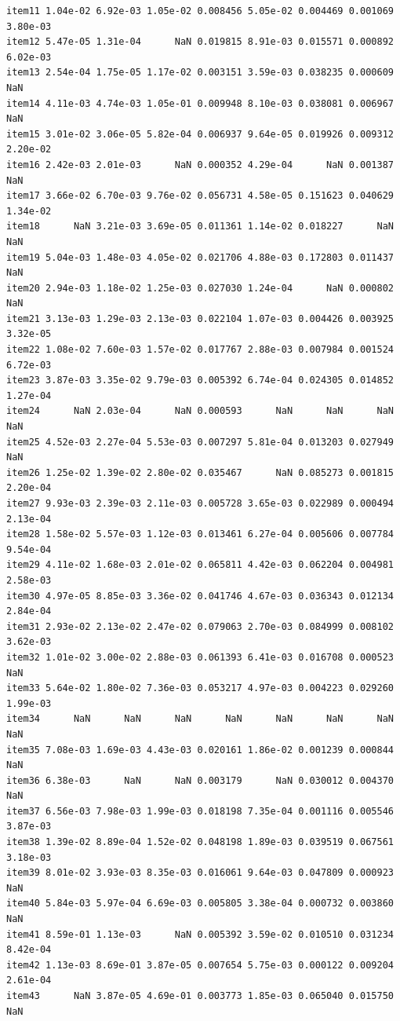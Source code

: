 \documentclass[
  a4paper,
]{ltjsbook}
\begin{document}
\begin{verbatim}
item11 1.04e-02 6.92e-03 1.05e-02 0.008456 5.05e-02 0.004469 0.001069 3.80e-03
item12 5.47e-05 1.31e-04      NaN 0.019815 8.91e-03 0.015571 0.000892 6.02e-03
item13 2.54e-04 1.75e-05 1.17e-02 0.003151 3.59e-03 0.038235 0.000609      NaN
item14 4.11e-03 4.74e-03 1.05e-01 0.009948 8.10e-03 0.038081 0.006967      NaN
item15 3.01e-02 3.06e-05 5.82e-04 0.006937 9.64e-05 0.019926 0.009312 2.20e-02
item16 2.42e-03 2.01e-03      NaN 0.000352 4.29e-04      NaN 0.001387      NaN
item17 3.66e-02 6.70e-03 9.76e-02 0.056731 4.58e-05 0.151623 0.040629 1.34e-02
item18      NaN 3.21e-03 3.69e-05 0.011361 1.14e-02 0.018227      NaN      NaN
item19 5.04e-03 1.48e-03 4.05e-02 0.021706 4.88e-03 0.172803 0.011437      NaN
item20 2.94e-03 1.18e-02 1.25e-03 0.027030 1.24e-04      NaN 0.000802      NaN
item21 3.13e-03 1.29e-03 2.13e-03 0.022104 1.07e-03 0.004426 0.003925 3.32e-05
item22 1.08e-02 7.60e-03 1.57e-02 0.017767 2.88e-03 0.007984 0.001524 6.72e-03
item23 3.87e-03 3.35e-02 9.79e-03 0.005392 6.74e-04 0.024305 0.014852 1.27e-04
item24      NaN 2.03e-04      NaN 0.000593      NaN      NaN      NaN      NaN
item25 4.52e-03 2.27e-04 5.53e-03 0.007297 5.81e-04 0.013203 0.027949      NaN
item26 1.25e-02 1.39e-02 2.80e-02 0.035467      NaN 0.085273 0.001815 2.20e-04
item27 9.93e-03 2.39e-03 2.11e-03 0.005728 3.65e-03 0.022989 0.000494 2.13e-04
item28 1.58e-02 5.57e-03 1.12e-03 0.013461 6.27e-04 0.005606 0.007784 9.54e-04
item29 4.11e-02 1.68e-03 2.01e-02 0.065811 4.42e-03 0.062204 0.004981 2.58e-03
item30 4.97e-05 8.85e-03 3.36e-02 0.041746 4.67e-03 0.036343 0.012134 2.84e-04
item31 2.93e-02 2.13e-02 2.47e-02 0.079063 2.70e-03 0.084999 0.008102 3.62e-03
item32 1.01e-02 3.00e-02 2.88e-03 0.061393 6.41e-03 0.016708 0.000523      NaN
item33 5.64e-02 1.80e-02 7.36e-03 0.053217 4.97e-03 0.004223 0.029260 1.99e-03
item34      NaN      NaN      NaN      NaN      NaN      NaN      NaN      NaN
item35 7.08e-03 1.69e-03 4.43e-03 0.020161 1.86e-02 0.001239 0.000844      NaN
item36 6.38e-03      NaN      NaN 0.003179      NaN 0.030012 0.004370      NaN
item37 6.56e-03 7.98e-03 1.99e-03 0.018198 7.35e-04 0.001116 0.005546 3.87e-03
item38 1.39e-02 8.89e-04 1.52e-02 0.048198 1.89e-03 0.039519 0.067561 3.18e-03
item39 8.01e-02 3.93e-03 8.35e-03 0.016061 9.64e-03 0.047809 0.000923      NaN
item40 5.84e-03 5.97e-04 6.69e-03 0.005805 3.38e-04 0.000732 0.003860      NaN
item41 8.59e-01 1.13e-03      NaN 0.005392 3.59e-02 0.010510 0.031234 8.42e-04
item42 1.13e-03 8.69e-01 3.87e-05 0.007654 5.75e-03 0.000122 0.009204 2.61e-04
item43      NaN 3.87e-05 4.69e-01 0.003773 1.85e-03 0.065040 0.015750      NaN

\end{verbatim}
\end{document}
